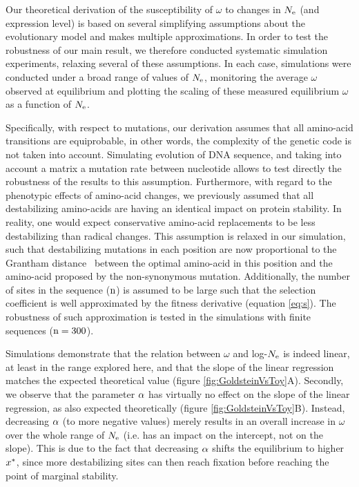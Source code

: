 Our theoretical derivation of the susceptibility of $\omega$ to changes in $N_{\mathrm{e}}$ (and expression level) is based on several simplifying assumptions about the evolutionary model and makes multiple approximations.
In order to test the robustness of our main result, we therefore conducted systematic simulation experiments, relaxing several of these assumptions.
In each case, simulations were conducted under a broad range of values of $N_{\mathrm{e}}$, monitoring the average $\omega$ observed at equilibrium and plotting the scaling of these measured equilibrium $\omega$ as a function of $N_{\mathrm{e}}$. 

Specifically, with respect to mutations, our derivation assumes that all amino-acid {transitions} are equiprobable, in other words, the complexity of the genetic code is not taken into account.
Simulating evolution of \acrshort{DNA} sequence, and taking into account a matrix a mutation rate between nucleotide allows to test directly the robustness of the results to this assumption.
Furthermore, with regard to the phenotypic effects of amino-acid changes, we previously assumed that all destabilizing amino-acids are having an identical impact on protein stability.
In reality, one would expect conservative amino-acid replacements to be less destabilizing than radical changes.
This assumption is relaxed in our simulation, such that destabilizing mutations in each position are now proportional to the Grantham distance~\citep{Grantham1974} between the optimal amino-acid in this position and the amino-acid proposed by the non-synonymous mutation.
Additionally, the number of sites in the sequence ($\text{n}$) is assumed to be large such that the selection coefficient is well approximated by the fitness derivative (equation \ref{eq:s}).
The robustness of such approximation is tested in the simulations with finite sequences ($\text{n}=300$).

Simulations demonstrate that the relation between $\omega$ and log-$N_{\mathrm{e}}$ is indeed linear, at least in the range explored here, and that the slope of the linear regression matches the expected theoretical value (figure \ref{fig:GoldsteinVsToy}A).
Secondly, we observe that the parameter $\alpha$ has virtually no effect on the slope of the linear regression, as also expected theoretically (figure \ref{fig:GoldsteinVsToy}B). Instead, decreasing $\alpha$ (to more negative values) merely results in an overall increase in $\omega$ over the whole range of $N_{\mathrm{e}}$ (i.e. has an impact on the intercept, not on the slope). This is due to the fact that decreasing $\alpha$ shifts the equilibrium to higher $x^{*}$, since more destabilizing sites can then reach fixation before reaching the point of marginal stability.

